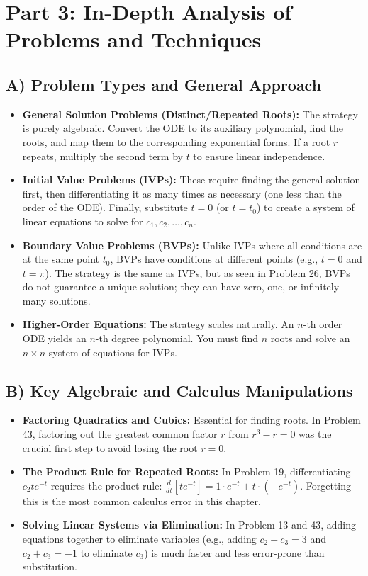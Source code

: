 \documentclass[12pt]{article}
\begin{document}
\newpage
\section{Part 3: In-Depth Analysis of Problems and Techniques}

\subsection{A) Problem Types and General Approach}
\begin{itemize}
    \item \textbf{General Solution Problems (Distinct/Repeated Roots):} The strategy is purely algebraic. Convert the ODE to its auxiliary polynomial, find the roots, and map them to the corresponding exponential forms. If a root $r$ repeats, multiply the second term by $t$ to ensure linear independence.
    \item \textbf{Initial Value Problems (IVPs):} These require finding the general solution first, then differentiating it as many times as necessary (one less than the order of the ODE). Finally, substitute $t=0$ (or $t=t_0$) to create a system of linear equations to solve for $c_1, c_2, \dots, c_n$.
    \item \textbf{Boundary Value Problems (BVPs):} Unlike IVPs where all conditions are at the same point $t_0$, BVPs have conditions at different points (e.g., $t=0$ and $t=\pi$). The strategy is the same as IVPs, but as seen in Problem 26, BVPs do not guarantee a unique solution; they can have zero, one, or infinitely many solutions.
    \item \textbf{Higher-Order Equations:} The strategy scales naturally. An $n$-th order ODE yields an $n$-th degree polynomial. You must find $n$ roots and solve an $n \times n$ system of equations for IVPs.
\end{itemize}

\subsection{B) Key Algebraic and Calculus Manipulations}
\begin{itemize}
    \item \textbf{Factoring Quadratics and Cubics:} Essential for finding roots. In Problem 43, factoring out the greatest common factor $r$ from $r^3 - r = 0$ was the crucial first step to avoid losing the root $r=0$.
    \item \textbf{The Product Rule for Repeated Roots:} In Problem 19, differentiating $c_2 t e^{-t}$ requires the product rule: $\frac{d}{dt}[t e^{-t}] = 1 \cdot e^{-t} + t \cdot (-e^{-t})$. Forgetting this is the most common calculus error in this chapter.
    \item \textbf{Solving Linear Systems via Elimination:} In Problem 13 and 43, adding equations together to eliminate variables (e.g., adding $c_2 - c_3 = 3$ and $c_2 + c_3 = -1$ to eliminate $c_3$) is much faster and less error-prone than substitution.
\end{itemize}
\end{document}
